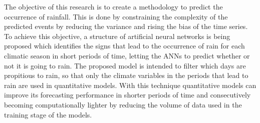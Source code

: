 The objective of this research is to create a methodology to predict the occurrence of rainfall. This is done by constraining the complexity of the predicted events by reducing the variance and rising the bias of the time series. To achieve this objective, a structure of artificial neural networks is being proposed which identifies the signs that lead to the occurrence of rain for each climatic season in short periods of time, letting the ANNs to predict whether or not it is going to rain. The proposed model is intended to filter which days are propitious to rain, so that only the climate variables in the periods that lead to rain are used in quantitative models. With this technique quantitative models can improve its forecasting performance in shorter periods of time and consecutively becoming computationally lighter by reducing the volume of data used in the training stage of the models. 



%
%
